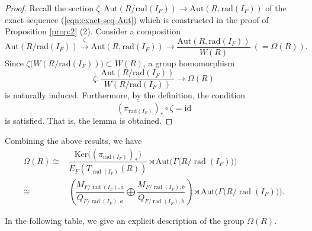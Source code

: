 \documentclass[11pt]{amsart}
\newcommand{\rad}{\operatorname{rad}}
\begin{document}
{\begin{proof}
Recall the section $\zeta:\mathrm{Aut}(R/\mathrm{rad}(I_F))\longrightarrow 
\mathrm{Aut}(R,\mathrm{rad}(I_F))$
of the exact sequence (\ref{eqn:exact-seq-Aut}) which is constructed in the proof of
Proposition \ref{prop:2} (2). Consider a composition
\[\mathrm{Aut}(R/\mathrm{rad}(I_F))\overset{\zeta}{\longrightarrow} 
\mathrm{Aut}(R,\mathrm{rad}(I_F)) \longrightarrow 
\dfrac{\mathrm{Aut}(R,\mathrm{rad}(I_F))}{W(R)}\ (=\Omega(R)).\]
Since $\zeta\big(W(R/\mathrm{rad}(I_F))\big)\subset W(R)$, a group homomorphism
\[\overline{\zeta}:\dfrac{\mathrm{Aut}(R/\mathrm{rad}(I_F))}{W(R/\mathrm{rad}(I_F))}
\longrightarrow \Omega(R)\]
is naturally induced. Furthermore, by the definition, the condition
\[\overline{(\pi_{\mathrm{rad}(I_F)})}_*\circ \overline{\zeta}=\mathrm{id}\]
is satisfied. That is, the lemma is obtained.   
\end{proof}

Combining the above results, we have
\begin{equation*}\label{eq:Omega2}
\begin{split}
\Omega(R) 
\cong 
&\dfrac{\mathrm{Ker}\bigl((\pi_{\mathrm{rad}(I_F)})_*\bigr)}{E_F(T_{\rad (I_F)}(R))}\rtimes 
\mathrm{Aut}\big(\Gamma\big(R/\rad(I_F)\big)\big) \\
\cong
&
\left(\dfrac{M_{F/\rad(I_F),a}}{Q_{F/\rad(I_F),a}}\bigoplus \dfrac{M_{F/\rad(I_F),b}}{Q_{F/\rad(I_F),b}}\right)
\rtimes\mathrm{Aut}\big(\Gamma\big(R/\rad(I_F)\big)\big).
\end{split}
\end{equation*}
}
In the following table, we give an explicit description of the group $\Omega(R)$.
\end{document}
